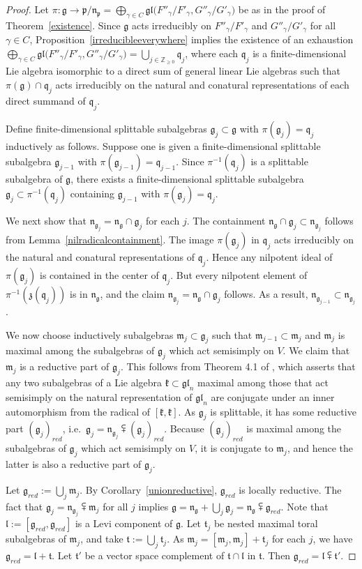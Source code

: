 \documentclass{article}
\newcommand {\Z} {\mathbb{Z}}
\def\gl{\mathfrak {gl}}
\def\g{\mathfrak {g}}
\def\l{\mathfrak {l}}
\def\m{\mathfrak {m}}
\def\n{\mathfrak {n}}
\def\p{\mathfrak {p}}
\def\t{\mathfrak{t}}
\def\z{\mathfrak {z}}
\def\k{\mathfrak{k}}
\def\q{\mathfrak{q}}
\begin{document}
\begin{proof}
Let $\pi : \g \rightarrow {\p} / {\n_\p} = \bigoplus_{\gamma \in C} \gl  \big(F''_\gamma / F'_\gamma , G''_\gamma / G'_\gamma \big)$ be as in the proof of Theorem~\ref{existence}.  
Since $\g$ acts irreducibly on $F''_\gamma  / F'_\gamma$ and $G''_\gamma / G'_\gamma$ for all $\gamma \in C$, Proposition~\ref{irreducibleeverywhere} implies the existence of
an exhaustion $ \bigoplus_{\gamma \in C} \gl  \big(F''_\gamma / F'_\gamma , G''_\gamma / G'_\gamma \big) = \bigcup_{j \in \Z_{\geq 0}} \q_j$, where each $\q_j$ is a finite-dimensional Lie algebra isomorphic to a direct sum of general linear Lie algebras such that $\pi(\g) \cap \q_j$ acts irreducibly on the natural and conatural representations of each direct summand of $\q_j$.

Define finite-dimensional splittable subalgebras $\g_j \subset \g$ with $\pi(\g_j) = \q_j$ inductively as follows.  Suppose one is given a finite-dimensional splittable subalgebra $\g_{j-1}$ with $\pi(\g_{j-1}) =  \q_{j-1}$.  Since $\pi^{-1} (\q_j)$ is a splittable subalgebra of $\g$, there exists a finite-dimensional splittable subalgebra $\g_j \subset \pi^{-1} (\q_j)$ containing $\g_{j-1}$ with $\pi(\g_j) = \q_j$.  

We next show that $\n_{\g_j} = \n_\g \cap \g_j$ for each $j$.  The containment $ \n_\g \cap \g_j \subset \n_{\g_j}$ follows from Lemma~\ref{nilradicalcontainment}.  The image $\pi(\g_j)$ in $\q_j$ acts irreducibly on the natural and conatural representations of $\q_j$.  Hence any nilpotent ideal of $\pi(\g_j)$ is contained in the center of $\q_j$.  But every nilpotent element of $\pi^{-1} (\z(\q_j))$ is in $\n_\g$, and the claim $\n_{\g_j} = \n_\g \cap \g_j$ follows.  As a result, $\n_{\g_{j-1}} \subset \n_{\g_j}$.

We now choose inductively subalgebras $\m_j \subset \g_j$ such that $\m_{j-1} \subset \m_j$ and $\m_j$ is maximal among the subalgebras of $\g_j$ which act semisimply on $V$.
We claim that $\m_j$ is a reductive part of $\g_j$.  This follows from Theorem 4.1 of \cite{Mostow}, which asserts that
any two subalgebras of a Lie algebra $\k \subset \gl_n$ maximal among those that act semisimply on the natural representation of $\gl_n$ are conjugate under an inner automorphism from the radical of $[\k,\k]$. As $\g_j$ is splittable, it has some reductive part $({\g_j})_{red}$, i.e.\ $\g_j = \n_{\g_j} \subsetplus ({\g_j})_{red}$.  Because $(\g_j)_{red}$ is maximal among the subalgebras of $\g_j$ which act semisimply on $V$, it is conjugate to $\m_j$, and hence the latter is also a reductive part of $\g_j$.

Let $\g_{red} := \bigcup_j \m_j$.  By Corollary~\ref{unionreductive}, $\g_{red}$ is locally reductive.  
The fact that $\g_j = \n_{\g_j} \subsetplus \m_j$ for all $j$ implies $\g = \n_\g + \bigcup_j \g_j = \n_\g \subsetplus \g_{red}$.  Note that  $\l := [\g_{red} , \g_{red}]$ is a Levi component of $\g$.
Let $\t_j$ be nested maximal toral subalgebras of $\m_j$, and take $\t := \bigcup_j \t_j$.  As $\m_j = [\m_j , \m_j] + \t_j$ for each $j$, we have $\g_{red} = \l + \t$.  Let $\t'$ be a vector space complement of $\t \cap \l$ in $\t$.  Then $\g_{red} = \l \subsetplus \t'$.
\end{proof}
\end{document}

